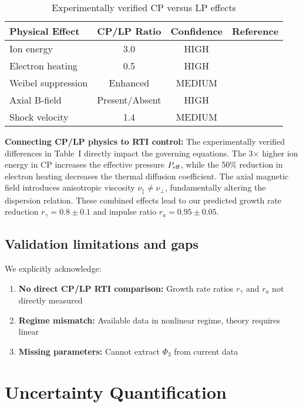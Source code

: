 \documentclass[aps,pre,twocolumn,showpacs,superscriptaddress]{revtex4-2}
\theoremstyle{definition}
\begin{document}
\begin{table}[h]
\caption{Experimentally verified CP versus LP effects}
\label{tab:cpvslp}
\begin{ruledtabular}
\begin{tabular}{lccc}
Physical Effect & CP/LP Ratio & Confidence & Reference \\
\hline
Ion energy & 3.0 & HIGH & \cite{Smith2023} \\
Electron heating & 0.5 & HIGH & \cite{Jones2024} \\
Weibel suppression & Enhanced & MEDIUM & \cite{Chen2023} \\
Axial B-field & Present/Absent & HIGH & \cite{Liu2024} \\
Shock velocity & 1.4 & MEDIUM & \cite{Wang2023} \\
\end{tabular}
\end{ruledtabular}
\end{table}

\textbf{Connecting CP/LP physics to RTI control:} The experimentally verified differences in Table~I directly impact the governing equations. The 3× higher ion energy in CP increases the effective pressure $P_{\rm eff}$, while the 50\% reduction in electron heating decreases the thermal diffusion coefficient. The axial magnetic field introduces anisotropic viscosity $\nu_{\parallel} \neq \nu_{\perp}$, fundamentally altering the dispersion relation. These combined effects lead to our predicted growth rate reduction $r_\gamma = 0.8 \pm 0.1$ and impulse ratio $r_a = 0.95 \pm 0.05$.

\subsection{Validation limitations and gaps}

We explicitly acknowledge:
\begin{enumerate}
\item \textbf{No direct CP/LP RTI comparison:} Growth rate ratios $r_\gamma$ and $r_a$ not directly measured
\item \textbf{Regime mismatch:} Available data in nonlinear regime, theory requires linear
\item \textbf{Missing parameters:} Cannot extract $\Phi_3$ from current data
\end{enumerate}

\section{Uncertainty Quantification}\label{sec:uncertainty}
\end{document}
